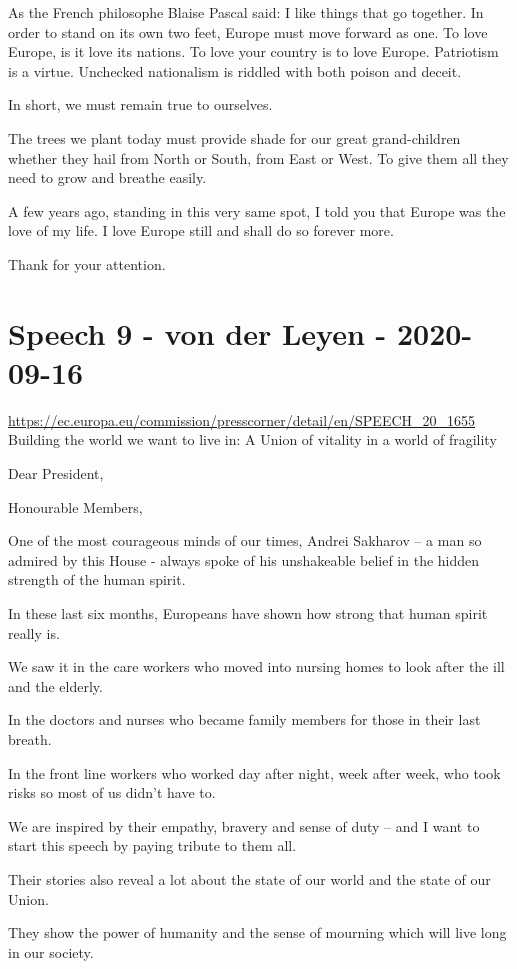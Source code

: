 \documentclass[a4paper,11pt]{article}
\begin{document}
As the French philosophe Blaise Pascal said: I like things that go together. In order to stand on its own two feet, Europe must move forward as one. To love Europe, is it love its nations. To love your country is to love Europe. Patriotism is a virtue. Unchecked nationalism is riddled with both poison and deceit.

In short, we must remain true to ourselves.

The trees we plant today must provide shade for our great grand-children whether they hail from North or South, from East or West. To give them all they need to grow and breathe easily.

A few years ago, standing in this very same spot, I told you that Europe was the love of my life. I love Europe still and shall do so forever more.

Thank for your attention.
 \newpage\section{Speech 9 - von der Leyen - 2020-09-16}
\url{https://ec.europa.eu/commission/presscorner/detail/en/SPEECH_20_1655}\\[3mm]
Building the world we want to live in: A Union of vitality in a world of fragility

 

Dear President,

Honourable Members,

One of the most courageous minds of our times, Andrei Sakharov – a man so admired by this House - always spoke of his unshakeable belief in the hidden strength of the human spirit.

In these last six months, Europeans have shown how strong that human spirit really is. 

We saw it in the care workers who moved into nursing homes to look after the ill and the elderly.

In the doctors and nurses who became family members for those in their last breath.

In the front line workers who worked day after night, week after week, who took risks so most of us didn't have to.

We are inspired by their empathy, bravery and sense of duty – and I want to start this speech by paying tribute to them all.

Their stories also reveal a lot about the state of our world and the state of our Union.

They show the power of humanity and the sense of mourning which will live long in our society.
\end{document}
